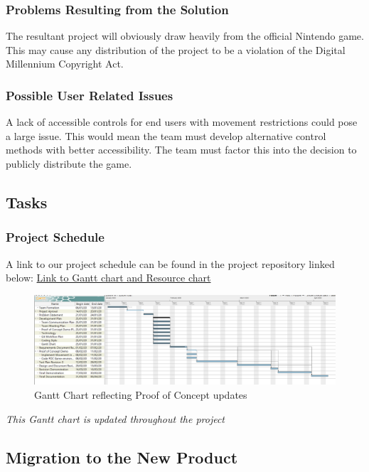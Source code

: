 \documentclass[12pt, titlepage]{article}
\begin{document}
\subsubsection{Problems Resulting from the Solution}
The resultant project will obviously draw heavily from the official Nintendo game. This may cause any distribution of the project to be a violation of the Digital Millennium Copyright Act. 

\subsubsection{Possible User Related Issues}
A lack of accessible controls for end users with movement restrictions could pose a large issue. This would mean the team must develop alternative control methods with better accessibility. The team must factor this into the decision to publicly distribute the game. 

\subsection{Tasks}
\subsubsection{Project Schedule}
A link to our project schedule can be found in the project repository linked below:
\href{https://gitlab.cas.mcmaster.ca/jandricd/super-refactored-mario-bros/tree/master/ProjectSchedule}{Link to Gantt chart and Resource chart}

\begin{figure}[H]
    \centering
    \includegraphics[width=\textwidth]{GanttChartSnapshotFeb9.png}
    \caption{Gantt Chart reflecting Proof of Concept updates}
    \label{fig:ganttchart}
\end{figure}

{\it This Gantt chart is updated throughout the project}

\subsection{Migration to the New Product}
\end{document}
